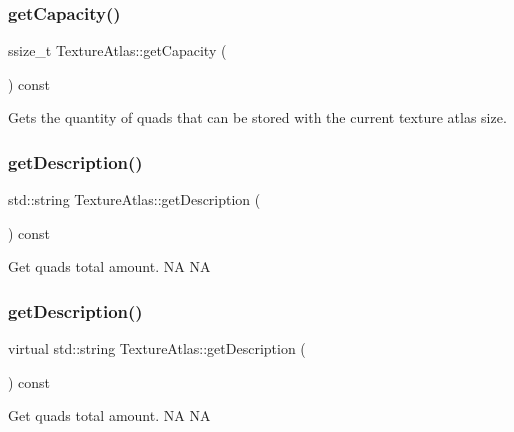 \subsubsection{\texorpdfstring{get\+Capacity()}{getCapacity()}\hspace{0.1cm}{\footnotesize\ttfamily [2/2]}}
{\footnotesize\ttfamily ssize\+\_\+t Texture\+Atlas\+::get\+Capacity (\begin{DoxyParamCaption}{ }\end{DoxyParamCaption}) const}

Gets the quantity of quads that can be stored with the current texture atlas size. \mbox{\label{classTextureAtlas_aa1cac3b15bf373f18fcf9a3565cd8700}} 
\subsubsection{\texorpdfstring{get\+Description()}{getDescription()}\hspace{0.1cm}{\footnotesize\ttfamily [1/2]}}
{\footnotesize\ttfamily std\+::string Texture\+Atlas\+::get\+Description (\begin{DoxyParamCaption}{ }\end{DoxyParamCaption}) const\hspace{0.3cm}{\ttfamily [virtual]}}

Get quads total amount.  NA  NA \mbox{\label{classTextureAtlas_a3a0b4443ac4466d657616396c88264b7}} 
\subsubsection{\texorpdfstring{get\+Description()}{getDescription()}\hspace{0.1cm}{\footnotesize\ttfamily [2/2]}}
{\footnotesize\ttfamily virtual std\+::string Texture\+Atlas\+::get\+Description (\begin{DoxyParamCaption}{ }\end{DoxyParamCaption}) const\hspace{0.3cm}{\ttfamily [virtual]}}

Get quads total amount.  NA  NA \mbox{\label{classTextureAtlas_ae6dc11457417198ddf8e1662e4b67fec}} 
